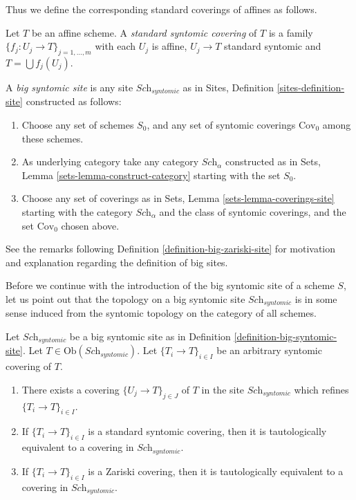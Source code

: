 \noindent
Thus we define the corresponding standard coverings of affines as follows.

\begin{definition}
\label{definition-standard-syntomic}
Let $T$ be an affine scheme. A {\it standard syntomic covering} of $T$ is
a family $\{f_j : U_j \to T\}_{j = 1, \ldots, m}$ with each $U_j$ is
affine, $U_j \to T$ standard syntomic and $T = \bigcup f_j(U_j)$.
\end{definition}

\begin{definition}
\label{definition-big-syntomic-site}
A {\it big syntomic site} is any site $\textit{Sch}_{syntomic}$ as in
Sites, Definition \ref{sites-definition-site} constructed as follows:
\begin{enumerate}
\item Choose any set of schemes $S_0$, and any set of syntomic coverings
$\text{Cov}_0$ among these schemes.
\item As underlying category take any category $\textit{Sch}_\alpha$
constructed as in Sets, Lemma \ref{sets-lemma-construct-category}
starting with the set $S_0$.
\item Choose any set of coverings as in
Sets, Lemma \ref{sets-lemma-coverings-site} starting with the
category $\textit{Sch}_\alpha$ and the class of syntomic coverings,
and the set $\text{Cov}_0$ chosen above.
\end{enumerate}
\end{definition}

\noindent
See the remarks following Definition \ref{definition-big-zariski-site}
for motivation and explanation regarding the definition of big sites.

\medskip\noindent
Before we continue with the introduction of the big syntomic site of
a scheme $S$, let us point out that the topology on a big syntomic site
$\textit{Sch}_{syntomic}$ is in some sense induced from the syntomic topology
on the category of all schemes.

\begin{lemma}
\label{lemma-syntomic-induced}
Let $\textit{Sch}_{syntomic}$ be a big syntomic site as in
Definition \ref{definition-big-syntomic-site}.
Let $T \in \text{Ob}(\textit{Sch}_{syntomic})$.
Let $\{T_i \to T\}_{i \in I}$ be an arbitrary syntomic covering of $T$.
\begin{enumerate}
\item There exists a covering $\{U_j \to T\}_{j \in J}$ of $T$ in the site
$\textit{Sch}_{syntomic}$ which refines $\{T_i \to T\}_{i \in I}$.
\item If $\{T_i \to T\}_{i \in I}$ is a standard syntomic covering, then
it is tautologically equivalent to a covering in $\textit{Sch}_{syntomic}$.
\item If $\{T_i \to T\}_{i \in I}$ is a Zariski covering, then
it is tautologically equivalent to a covering in $\textit{Sch}_{syntomic}$.
\end{enumerate}
\end{lemma}

